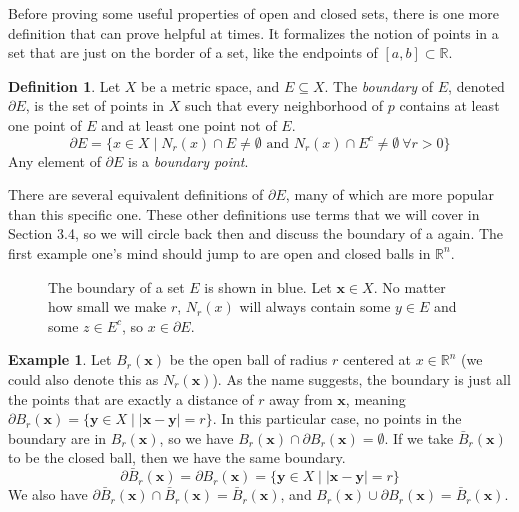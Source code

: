 \documentclass{article}
\newcommand{\R}{\mathbb{R}}
\newcommand{\x}{\mathbf{x}}
\newcommand{\y}{\mathbf{y}}
\theoremstyle{definition}
\newtheorem{definition}{Definition}[section]
\newtheorem{example}{Example}[section]
\begin{document}
Before proving some useful properties of open and closed sets, there is one more definition that can prove helpful at times. It formalizes the notion of points in a set that are just on the border of a set, like the endpoints of $ [a,b]\subset\R $.  
\begin{definition}
	Let $ X $ be a metric space, and $ E\subseteq X $. The \textit{\color{red}boundary} of $ E $, denoted $ \partial E $, is the set of points in $ X $ such that every neighborhood of $ p $ contains at least one point of $ E $ and at least one point not of $ E $. $$ \partial E=\{x\in X\mid N_r(x)\cap E\neq\emptyset\text{ and }N_r(x)\cap  E^c\neq\emptyset \ \forall r>0  \} $$ 
	Any element of $ \partial E $ is a \textit{\color{red}boundary point}.
\end{definition}
There are several equivalent definitions of $ \partial E $, many of which are more popular than this specific one. These other definitions use terms that we will cover in Section 3.4, so we will circle back then and discuss the boundary of a again. The first example one's mind should jump to are open and closed balls in $ \R^n $. 
  \begin{figure}[h]
  	\centering
  	\caption{The boundary of a set $ E $ is shown in blue. Let $ \x\in X $. No matter how small we make $ r $, $ N_r(x) $ will always contain some $ y\in E $ and some $ z\in E^c $, so $ x\in\partial E $. } 
  \end{figure}
\begin{example}
	Let $ B_r(\x) $ be the open ball of radius $ r $ centered at $ x\in\R^n $ (we could also denote this as $ N_r(\x) $). As the name suggests, the boundary is just all the points that are exactly a distance of $ r $ away from $ \x $, meaning $ \partial B_r(\x)=\{\y\in X\mid |\x-\y|=r\} $. In this particular case, no points in the boundary are in $ B_r(\x) $, so we have $ B_r(\x)\cap\partial B_r(\x)=\emptyset  $. If we take $ \bar{B}_r(\x) $ to be the closed ball, then we have the same boundary. $$\partial \bar{B}_r(\x)=\partial B_r(\x)=\{\y\in X\mid |\x-\y|=r\} $$ We also have $ \partial \bar{B}_r(\x)\cap \bar{B}_r(\x)=\bar{B}_r(\x)  $, and $ B_r(\x)\cup\partial B_r(\x)=\bar{B}_r(\x) $. 
\end{example}
\end{document}
